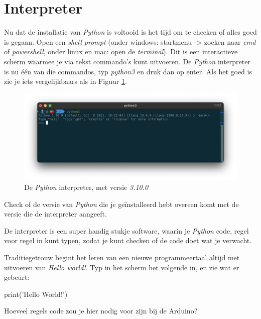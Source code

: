 \section{Interpreter}
Nu dat de installatie van \textit{Python} is voltooid is het tijd om te checken of alles goed is gegaan. Open een \textit{shell prompt} (onder windows: startmenu -> zoeken naar \textit{cmd} of \textit{powershell}, onder linux en mac: open de \textit{terminal}). Dit is een interactieve scherm waarmee je via tekst commando's kunt uitvoeren. De \textit{Python} interpreter is nu één van die commandos, typ \textit{python3} en druk dan op enter. Als het goed is zie je iets vergelijkbaars als in Figuur \ref{fig:interpreter}.
\begin{figure}[h!]
\centering\includegraphics[scale=0.5]{Pictures/chapter04/python_shell.png}
\caption{De \textit{Python} interpreter, met versie \textit{3.10.0}}
\label{fig:interpreter} %
\end{figure}
\begin{exercise}
Check of de versie van \textit{Python} die je geïnstalleerd hebt overeen komt met de versie die de interpreter aangeeft.
\end{exercise}

De interpreter is een super handig stukje software, waarin je \textit{Python} code, regel voor regel in kunt typen, zodat je kunt checken of de code doet wat je verwacht. 
\begin{exercise}
Traditiegetrouw begint het leren van een nieuwe programmeertaal altijd met uitvoeren van \textit{Hello world!}. Typ in het scherm het volgende in, en zie wat er gebeurt:
\begin{python}[numbers=none]
print('Hello World!')
\end{python}
Hoeveel regels code zou je hier nodig voor zijn bij de Arduino?
\end{exercise}


